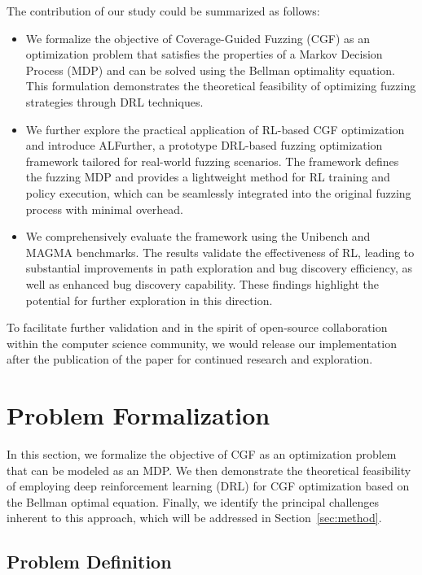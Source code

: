 \documentclass[lettersize,journal]{IEEEtran}
\begin{document}
The contribution of our study could be summarized as follows:
\begin{itemize} 
	\item We formalize the objective of Coverage-Guided Fuzzing (CGF) as an optimization problem that satisfies the properties of a Markov Decision Process (MDP) and can be solved using the Bellman optimality equation. This formulation demonstrates the theoretical feasibility of optimizing fuzzing strategies through DRL techniques.
	\item We further explore the practical application of RL-based CGF optimization and introduce ALFurther, a prototype DRL-based fuzzing optimization framework tailored for real-world fuzzing scenarios. The framework defines the fuzzing MDP and provides a lightweight method for RL training and policy execution, which can be seamlessly integrated into the original fuzzing process with minimal overhead.
	\item We comprehensively evaluate the framework using the Unibench and MAGMA benchmarks. The results validate the effectiveness of RL, leading to substantial improvements in path exploration and bug discovery efficiency, as well as enhanced bug discovery capability. These findings highlight the potential for further exploration in this direction.
\end{itemize}

To facilitate further validation and in the spirit of open-source collaboration within the computer science community, we would release our implementation after the publication of the paper for continued research and exploration.



\section{Problem Formalization}\label{sec:background}

In this section, we formalize the objective of CGF as an optimization problem that can be modeled as an MDP. We then demonstrate the theoretical feasibility of employing deep reinforcement learning (DRL) for CGF optimization based on the Bellman optimal equation. Finally, we identify the principal challenges inherent to this approach, which will be addressed in Section \ref{sec:method}. 

\subsection{Problem Definition}
\end{document}
